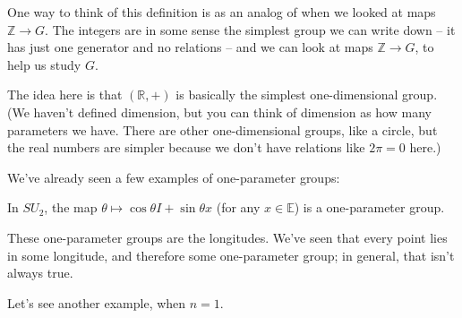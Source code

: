 One way to think of this definition is as an analog of when we looked at maps $\mathbb{Z} \to G$. The integers are in some sense the simplest group we can write down -- it has just one generator and no relations -- and we can look at maps $\mathbb{Z} \to G$, to help us study $G$. 

The idea here is that $(\mathbb{R}, +)$ is basically the simplest one-dimensional group. (We haven't defined dimension, but you can think of dimension as how many parameters we have. There are other one-dimensional groups, like a circle, but the real numbers are simpler because we don't have relations like $2\pi = 0$ here.)



We've already seen a few examples of one-parameter groups:
\begin{example}
In $SU_2$, the map $\theta \mapsto \cos \theta I + \sin \theta x$ (for any $x \in \mathbb{E}$) is a one-parameter group. 
\end{example}

These one-parameter groups are the longitudes. We've seen that every point lies in some longitude, and therefore some one-parameter group; in general, that isn't always true. 



Let's see another example, when $n = 1$.

